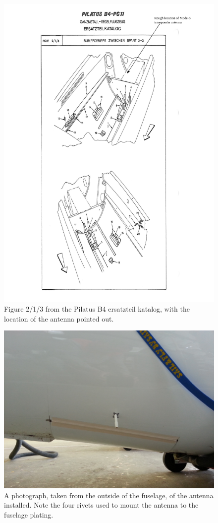 \documentclass{article}
\begin{document}
\begin{figure}
\includegraphics[width=\textwidth,keepaspectratio]{b4_ersatzteil_katalog_fig_2_1_3_annotated}
\caption{Figure 2/1/3 from the Pilatus B4 ersatzteil katalog, with the location of the antenna pointed out.}
\label{fig:ersatzteil_antenna}
\end{figure}

\begin{figure}
\includegraphics[width=\textwidth,keepaspectratio]{outside}
\caption{A photograph, taken from the outside of the fuselage, of the antenna installed. Note the four rivets used to mount the antenna to the fuselage plating.}
\label{fig:outside}
\end{figure}
\end{document}
